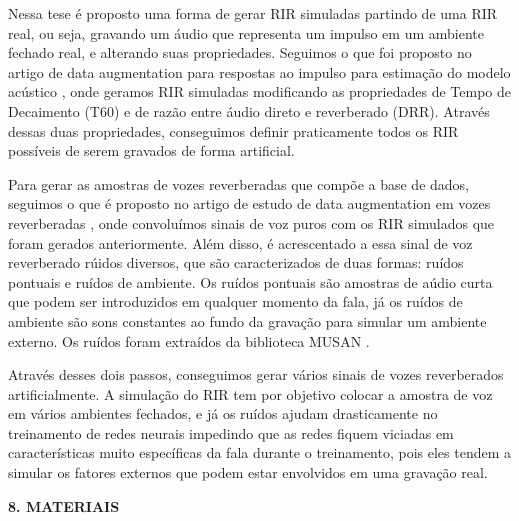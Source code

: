 \documentclass[a4paper,12pt,oneside,openany]{report}
\begin{document}
Nessa tese é proposto uma forma de gerar RIR simuladas partindo de uma RIR real, ou seja, gravando um áudio que representa um impulso em um ambiente
fechado real, e alterando suas propriedades. Seguimos o que foi proposto no artigo de data augmentation para respostas ao impulso para
estimação do modelo acústico \cite{RIR_Data_Aug}, onde geramos RIR simuladas modificando as propriedades de Tempo de Decaimento (T60) e de
razão entre áudio direto e reverberado (DRR). Através dessas duas propriedades, conseguimos definir praticamente todos os RIR possíveis de serem gravados
de forma artificial.

Para gerar as amostras de vozes reverberadas que compõe a base de dados, seguimos o que é proposto no artigo de estudo de data
augmentation em vozes reverberadas \cite{Speech_Rec}, onde convoluímos sinais de voz puros com os RIR simulados que foram gerados anteriormente.
Além disso, é acrescentado a essa sinal de voz reverberado rúidos diversos, que são caracterizados de duas formas: ruídos pontuais e ruídos de ambiente.
Os ruídos pontuais são amostras de aúdio curta que podem ser introduzidos em qualquer momento da fala, já os ruídos de ambiente são sons constantes
ao fundo da gravação para simular um ambiente externo. Os ruídos foram extraídos da biblioteca MUSAN \cite{noiseLib}.

Através desses dois passos, conseguimos gerar vários sinais de vozes reverberados artificialmente. A simulação do RIR tem por objetivo colocar
a amostra de voz em vários ambientes fechados, e já os ruídos ajudam drasticamente no treinamento de redes neurais impedindo que as redes fiquem
viciadas em características muito específicas da fala durante o treinamento, pois eles tendem a simular os fatores externos que podem estar envolvidos em uma
gravação real.

\vspace{0.4cm}
\textbf{8. MATERIAIS}
\end{document}
